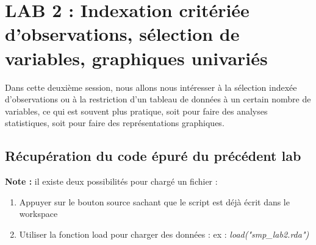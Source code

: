 \begin{lstlisting}[language=html]

\end{lstlisting}









\newpage

\section{LAB 2 : Indexation critériée d'observations, sélection de variables, graphiques univariés}

Dans cette deuxième session, nous allons nous intéresser à la sélection indexée d'observations ou à la restriction d'un tableau de données à un certain nombre de variables, ce qui est souvent plus pratique, soit pour faire des analyses statistiques, soit pour faire des représentations graphiques.
\subsection*{Récupération du code épuré du précédent lab}
\textbf{Note : } il existe deux possibilités pour chargé un fichier : 
\begin{enumerate}
\item Appuyer sur le bouton source sachant que le script est déjà écrit dans le workspace
\item Utiliser la fonction load pour charger des données : ex : \textit{load("smp\_lab2.rda")}
\end{enumerate}

